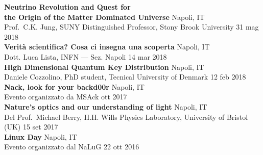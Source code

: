 \documentclass[a4paper]{article}
\begin{document}
\vspace*{2mm}
\textbf{Neutrino Revolution and Quest for \\ the Origin of the Matter Dominated Universe} \hfill Napoli, IT \\
Prof.\ C.K. Jung, SUNY Distinguished Professor, Stony Brook University
\hfill 31 mag 2018 \\
\vspace*{2mm}
\textbf{Verità scientifica? Cosa ci insegna una scoperta}
\hfill Napoli, IT \\
Dott. Luca Lista, INFN --- Sez. Napoli
\hfill 14 mar 2018 \\
\vspace*{2mm}
\textbf{High Dimensional Quantum Key Distribution} \hfill Napoli, IT \\
Daniele Cozzolino, PhD student, Tecnical University of Denmark
\hfill 12 feb 2018 \\
\vspace*{2mm}
\textbf{Nack, look for your backd00r} \hfill Napoli, IT \\
Evento organizzato da MSAck \hfill ott 2017  \\
\vspace*{2mm}
\textbf{Nature's optics and our understanding of light} \hfill Napoli, IT \\
Del Prof.\ Michael Berry,
H.H. Wills Physics Laboratory,
University of Bristol (UK) \hfill 15 set 2017 \\
\vspace*{2mm}
\textbf{Linux Day} \hfill Napoli, IT \\
Evento organizzato dal NaLuG \hfill 22 ott 2016 \\
\vspace*{2mm}
\end{document}
